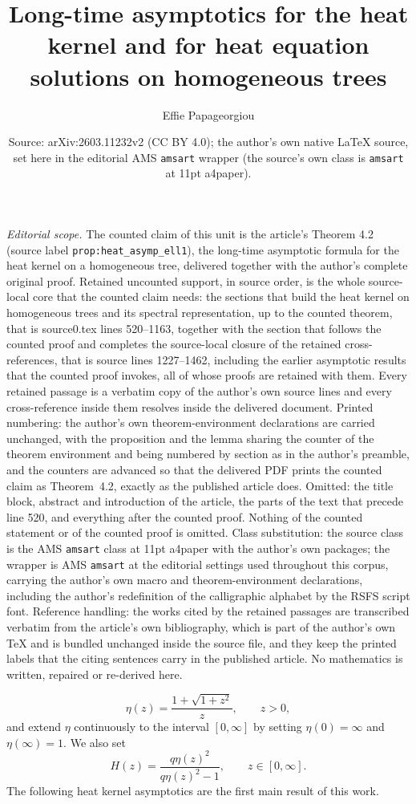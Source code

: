 \documentclass[10pt,a4paper]{amsart}
\title{Long-time asymptotics for the heat kernel and for heat equation solutions on homogeneous trees}
\author{Effie Papageorgiou}
\date{Source: arXiv:2603.11232v2 (CC BY 4.0); the author's own native \LaTeX{} source, set here in the editorial AMS \texttt{amsart} wrapper (the source's own class is \texttt{amsart} at 11pt a4paper).}
\theoremstyle{plain}
\theoremstyle{remark}
\theoremstyle{definition}
\begin{document}
\maketitle
\noindent\textit{Editorial scope.} The counted claim of this unit is the article's Theorem 4.2 (source label \texttt{prop:heat\_asymp\_ell1}), the long-time asymptotic formula for the heat kernel on a homogeneous tree, delivered together with the author's complete original proof. Retained uncounted support, in source order, is the whole source-local core that the counted claim needs: the sections that build the heat kernel on homogeneous trees and its spectral representation, up to the counted theorem, that is source0.tex lines 520--1163, together with the section that follows the counted proof and completes the source-local closure of the retained cross-references, that is source lines 1227--1462, including the earlier asymptotic results that the counted proof invokes, all of whose proofs are retained with them. Every retained passage is a verbatim copy of the author's own source lines and every cross-reference inside them resolves inside the delivered document. Printed numbering: the author's own theorem-environment declarations are carried unchanged, with the proposition and the lemma sharing the counter of the theorem environment and being numbered by section as in the author's preamble, and the counters are advanced so that the delivered PDF prints the counted claim as Theorem~4.2, exactly as the published article does. Omitted: the title block, abstract and introduction of the article, the parts of the text that precede line 520, and everything after the counted proof. Nothing of the counted statement or of the counted proof is omitted. Class substitution: the source class is the AMS \texttt{amsart} class at 11pt a4paper with the author's own packages; the wrapper is AMS \texttt{amsart} at the editorial settings used throughout this corpus, carrying the author's own macro and theorem-environment declarations, including the author's redefinition of the calligraphic alphabet by the RSFS script font. Reference handling: the works cited by the retained passages are transcribed verbatim from the article's own bibliography, which is part of the author's own TeX and is bundled unchanged inside the source file, and they keep the printed labels that the citing sentences carry in the published article. No mathematics is written, repaired or re-derived here.

\setcounter{section}{1}
\setcounter{theorem}{0}
\begin{equation}\label{eq:def_eta}
\eta(z)=\frac{1+\sqrt{1+z^2}}{z},
\qquad z>0,
\end{equation}
and extend $\eta$ continuously to the interval
$[0,\infty]$ by setting $\eta(0)=\infty$ and $\eta(\infty)=1$.
We also set
\[
H(z)=\frac{q\eta(z)^2}{q\eta(z)^2-1},
\qquad z\in[0,\infty].
\]
The following heat kernel asymptotics are the first main result of this work.
\end{document}
